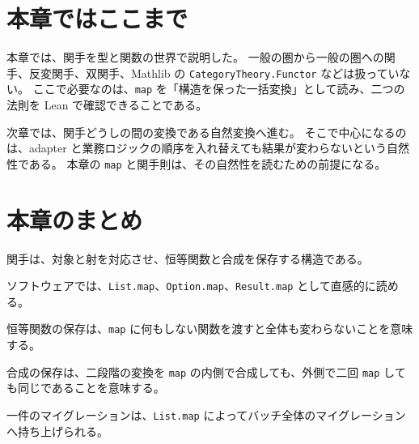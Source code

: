 \section{本章ではここまで}

本章では、関手を型と関数の世界で説明した。
一般の圏から一般の圏への関手、反変関手、双関手、Mathlib の \texttt{CategoryTheory.Functor} などは扱っていない。
ここで必要なのは、\texttt{map} を「構造を保った一括変換」として読み、二つの法則を Lean で確認できることである。

次章では、関手どうしの間の変換である自然変換へ進む。
そこで中心になるのは、adapter と業務ロジックの順序を入れ替えても結果が変わらないという自然性である。
本章の \texttt{map} と関手則は、その自然性を読むための前提になる。

\section{本章のまとめ}

関手は、対象と射を対応させ、恒等関数と合成を保存する構造である。

ソフトウェアでは、\texttt{List.map}、\texttt{Option.map}、\texttt{Result.map} として直感的に読める。

恒等関数の保存は、\texttt{map} に何もしない関数を渡すと全体も変わらないことを意味する。

合成の保存は、二段階の変換を \texttt{map} の内側で合成しても、外側で二回 \texttt{map} しても同じであることを意味する。

一件のマイグレーションは、\texttt{List.map} によってバッチ全体のマイグレーションへ持ち上げられる。
